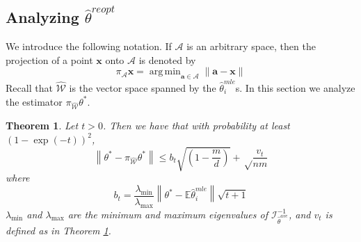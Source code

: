 \documentclass[twoside]{article}
\newtheorem{theorem}{Theorem}
\DeclareMathOperator*{\argmin}{arg\,min}
\newcommand{\W}{\mathcal{\hat W}}
\newcommand{\Wave}{{\mathcal{\hat W}^{ave}}}
\newcommand{\A}{\mathcal{A}}
\newcommand{\E}{\mathbb{E}}
\newcommand{\x}{\mathbf{x}}
\newcommand{\w}{\theta}
\newcommand{\wreopt}{\hat\w^{reopt}}
\newcommand{\wave}{\hat\w^{ave}}
\newcommand{\wmle}{\hat\w^{mle}}
\newcommand{\wstar}{{\w^{*}}}
\newcommand{\tbias}{t_{\text{\textit{bias}}}}
\newcommand{\I}{\mathcal I}
\newcommand{\ltwo}[1]{{\left\lVert {#1} \right\rVert}}
\newcommand{\lzero}[1]{{\lVert {#1} \rVert}_0}
\newcommand{\proj}[1]{\pi_{{#1}}}
\begin{document}

\subsection{Analyzing $\wreopt$}
\label{sec:analreopt}

%

We introduce the following notation.
If $\A$ is an arbitrary space,
then the projection of a point $\x$ onto $\A$ is denoted by
\begin{equation}
\proj{\A}\x = \argmin_{\mathbf{a}\in\A} \ltwo{\mathbf{a}-\x}
\end{equation}
Recall that $\W$ is the vector space spanned by the $\wmle_i$s.
In this section we analyze the estimator $\proj{\W}\wstar$.

\begin{theorem}
\label{thm:wave}
Let $t>0$.
Then we have that with probability at least $(1-\exp(-t))^2$,
\begin{equation}
\ltwo{\wstar-\proj\W\wstar}
\le
b_t\sqrt{\left(1-\frac{m}{d}\right)}
+
\sqrt\frac{v_{t}}{nm}
\end{equation}
where
\begin{equation}
b_t = \frac{\lambda_{\min}}{\lambda_{\max}}\ltwo{\wstar-\E\wmle_i}\sqrt{t + 1}
\end{equation}
$\lambda_{\min}$ and $\lambda_{\max}$ are the minimum and maximum eigenvalues of $\I^{-1}_{\wave}$,
and $v_t$ is defined as in Theorem \ref{thm:wave}.
\end{theorem}
\end{document}
